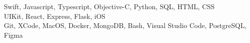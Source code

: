    Swift, Javascript, Typescript, Objective-C, Python, SQL, HTML, CSS \\
   UIKit, React, Express, Flask, iOS\\
  Git, XCode, MacOS, Docker, MongoDB, Bash, Visual Studio Code, PostgreSQL, Figma
